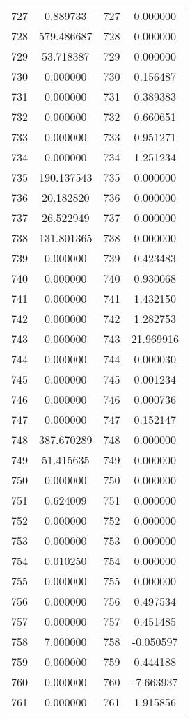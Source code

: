 \documentclass[12pt]{article}
\begin{document}
\begin{longtable}{@{}cccc@{}}
727 & 0.889733 & 727 & 0.000000 \\
728 & 579.486687 & 728 & 0.000000 \\
729 & 53.718387 & 729 & 0.000000 \\
730 & 0.000000 & 730 & 0.156487 \\
731 & 0.000000 & 731 & 0.389383 \\
732 & 0.000000 & 732 & 0.660651 \\
733 & 0.000000 & 733 & 0.951271 \\
734 & 0.000000 & 734 & 1.251234 \\
735 & 190.137543 & 735 & 0.000000 \\
736 & 20.182820 & 736 & 0.000000 \\
737 & 26.522949 & 737 & 0.000000 \\
738 & 131.801365 & 738 & 0.000000 \\
739 & 0.000000 & 739 & 0.423483 \\
740 & 0.000000 & 740 & 0.930068 \\
741 & 0.000000 & 741 & 1.432150 \\
742 & 0.000000 & 742 & 1.282753 \\
743 & 0.000000 & 743 & 21.969916 \\
744 & 0.000000 & 744 & 0.000030 \\
745 & 0.000000 & 745 & 0.001234 \\
746 & 0.000000 & 746 & 0.000736 \\
747 & 0.000000 & 747 & 0.152147 \\
748 & 387.670289 & 748 & 0.000000 \\
749 & 51.415635 & 749 & 0.000000 \\
750 & 0.000000 & 750 & 0.000000 \\
751 & 0.624009 & 751 & 0.000000 \\
752 & 0.000000 & 752 & 0.000000 \\
753 & 0.000000 & 753 & 0.000000 \\
754 & 0.010250 & 754 & 0.000000 \\
755 & 0.000000 & 755 & 0.000000 \\
756 & 0.000000 & 756 & 0.497534 \\
757 & 0.000000 & 757 & 0.451485 \\
758 & 7.000000 & 758 & -0.050597 \\
759 & 0.000000 & 759 & 0.444188 \\
760 & 0.000000 & 760 & -7.663937 \\
761 & 0.000000 & 761 & 1.915856 \\

\end{longtable}
\end{document}
